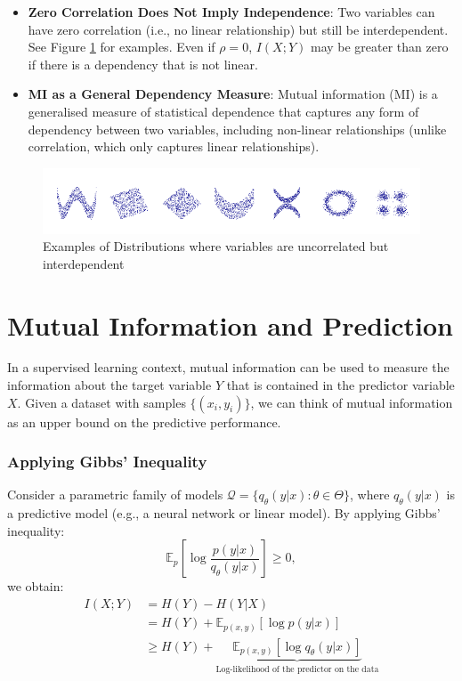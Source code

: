 \begin{itemize}
    \item \textbf{Zero Correlation Does Not Imply Independence}: Two variables can have zero correlation (i.e., no linear relationship) but still be interdependent. See Figure \ref{fig:uncorrelated_interdependent} for examples. Even if \( \rho = 0 \), \( I(X; Y) \) may be greater than zero if there is a dependency that is not linear. 
    \item \textbf{MI as a General Dependency Measure}: Mutual information (MI) is a generalised measure of statistical dependence that captures any form of dependency between two variables, including non-linear relationships (unlike correlation, which only captures linear relationships).
\end{itemize}


\begin{figure}[h]
    \centering
    \includegraphics[width=1\textwidth]{img/uncorrelated_interdependent.png}
    \caption{Examples of Distributions where variables are uncorrelated but interdependent}
    \label{fig:uncorrelated_interdependent}
\end{figure}

\section{Mutual Information and Prediction}

In a supervised learning context, mutual information can be used to measure the information about the target variable \( Y \) that is contained in the predictor variable \( X \). Given a dataset with samples \( \{(x_i, y_i)\} \), we can think of mutual information as an upper bound on the predictive performance.

\subsubsection{Applying Gibbs' Inequality}
Consider a parametric family of models \( \mathcal{Q} = \{ q_\theta(y | x) : \theta \in \Theta \} \), where \( q_\theta(y | x) \) is a predictive model (e.g., a neural network or linear model). By applying Gibbs' inequality:
\[
\mathbb{E}_p \left[ \log \frac{p(y | x)}{q_\theta(y | x)} \right] \geq 0,
\]
we obtain:
\begin{align*}
    I(X; Y) & = H(Y) - H(Y | X) \\
            & = H(Y) + \mathbb{E}_{p(x, y)} [\log p(y | x)] \\
            & \geq H(Y) + \underbrace{\mathbb{E}_{p(x, y)} [\log q_\theta(y | x)]}_{\text{Log-likelihood of the predictor on the data}}
\end{align*}

